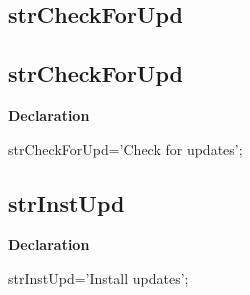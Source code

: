 \documentclass{report}
\newif\ifpdf
\begin{document}
\subsection*{\large{\textbf{strCheckForUpd}}\normalsize\hspace{1ex}\hrulefill}
\else
\subsection*{strCheckForUpd}
\fi
\label{trstrings-strCheckForUpd}
\begin{list}{}{
\setlength{\itemindent}{0cm}
\setlength{\listparindent}{0cm}
\setlength{\leftmargin}{\evensidemargin}
\addtolength{\leftmargin}{\tmplength}
\settowidth{\labelsep}{X}
\addtolength{\leftmargin}{\labelsep}
\setlength{\labelwidth}{\tmplength}
}
\item[\textbf{Declaration}\hfill]
\ifpdf
\begin{flushleft}
\fi
\begin{ttfamily}
strCheckForUpd='Check for updates';\end{ttfamily}

\ifpdf
\end{flushleft}
\fi

\end{list}
\ifpdf
\subsection*{\large{\textbf{strInstUpd}}\normalsize\hspace{1ex}\hrulefill}
\else
\subsection*{strInstUpd}
\fi
\label{trstrings-strInstUpd}
\begin{list}{}{
\setlength{\itemindent}{0cm}
\setlength{\listparindent}{0cm}
\setlength{\leftmargin}{\evensidemargin}
\addtolength{\leftmargin}{\tmplength}
\settowidth{\labelsep}{X}
\addtolength{\leftmargin}{\labelsep}
\setlength{\labelwidth}{\tmplength}
}
\item[\textbf{Declaration}\hfill]
\ifpdf
\begin{flushleft}
\fi
\begin{ttfamily}
strInstUpd='Install updates';\end{ttfamily}

\ifpdf
\end{flushleft}
\fi

\end{list}
\ifpdf
\end{document}
